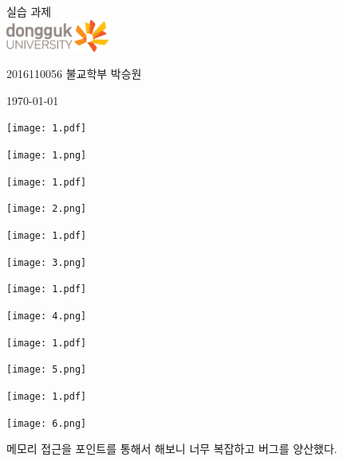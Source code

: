 \documentclass[11pt,a4paper]{article}
\begin{document}
\begin{center}
	  실습  과제\\
	\vspace{2cm}
\hfill\includegraphics[height=30pt]{logo.jpg}

\hfill\Large 2016110056 불교학부 박승원

\hfill\today
\end{center}

\noindent
\lstset{language=C, columns=flexible, tabsize=4, frame=shadowbox, showstringspaces=false, breaklines=true, upquote=true, basicstyle=\ttfamily\large}
\begin{enumerate}
\texttt{[image: 1.pdf]}
	
\texttt{[image: 1.png]}	

\texttt{[image: 1.pdf]}
	
\texttt{[image: 2.png]}	


\texttt{[image: 1.pdf]}
	
\texttt{[image: 3.png]}	

\texttt{[image: 1.pdf]}
	
\texttt{[image: 4.png]}	


\texttt{[image: 1.pdf]}
	
\texttt{[image: 5.png]}	

\texttt{[image: 1.pdf]}
	
\texttt{[image: 6.png]}	

\end{enumerate}

{}
\indent
메모리 접근을 포인트를 통해서 해보니 너무 복잡하고 버그를 양산했다.
\end{document}
